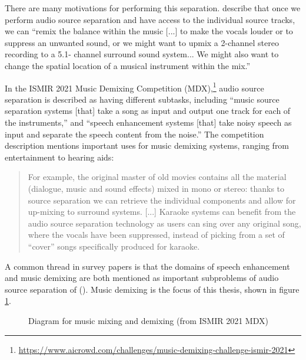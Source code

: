\documentclass[report.tex]{subfiles}
\begin{document}
There are many motivations for performing this separation. \textcite{musicsepgood} describe that once we perform audio source separation and have access to the individual source tracks, we can ``remix the balance within the music [...] to make the vocals louder or to suppress an unwanted sound, or we might want to upmix a 2-channel stereo recording to a 5.1-
channel surround sound system... We might also want to change the spatial location of a musical instrument within the mix.''

In the ISMIR 2021 Music Demixing Competition (MDX),\footnote{\url{https://www.aicrowd.com/challenges/music-demixing-challenge-ismir-2021}} audio source separation is described as having different subtasks, including ``music source separation systems [that] take a song as input and output one track for each of the instruments,'' and ``speech enhancement systems [that] take noisy speech as input and separate the speech content from the noise.'' The competition description mentions important uses for music demixing systems, ranging from entertainment to hearing aids:

\begin{quote}
	For example, the original master of old movies contains all the material (dialogue, music and sound effects) mixed in mono or stereo: thanks to source separation we can retrieve the individual components and allow for up-mixing to surround systems. [...] Karaoke systems can benefit from the audio source separation technology as users can sing over any original song, where the vocals have been suppressed, instead of picking from a set of ``cover'' songs specifically produced for karaoke.
\end{quote}

A common thread in survey papers is that the domains of speech enhancement and music demixing are both mentioned as important subproblems of audio source separation of (\cite{musicsepintro1, musicsepsurvey}). Music demixing is the focus of this thesis, shown in figure \ref{fig:mixingdiagrams}.

\begin{figure}[ht]
	\centering
	\caption{Diagram for music mixing and demixing (from ISMIR 2021 MDX)}
	\label{fig:mixingdiagrams}
\end{figure}
\end{document}
